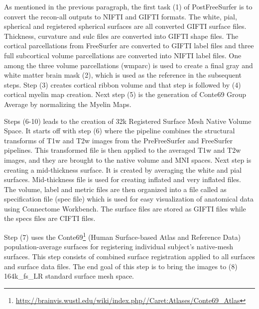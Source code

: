 As mentioned in the previous paragraph, the first task (1) of PostFreeSurfer is to convert the recon-all outputs to NIFTI and GIFTI formats. The white, pial, spherical and registered spherical surfaces are all converted GIFTI surface files. Thickness, curvature and sulc files are converted into GIFTI shape files. The cortical parcellations from FreeSurfer are converted to GIFTI label files and three full subcortical volume parcellations are converted into NIFTI label files. One among the three volume parcellations (wmparc) is used to create a final gray and white matter brain mask (2), which is used as the reference in the subsequent steps. Step (3) creates cortical ribbon volume and that step is followed by (4) cortical myelin map creation. Next step (5) is the generation of Conte69 Group Average by normalizing the Myelin Maps. 


Steps (6-10) leads to the creation of 32k Registered Surface Mesh Native Volume Space. It starts off with step (6) where the pipeline combines the structural transforms of T1w and T2w images from the PreFreeSurfer and FreeSurfer pipelines. This transformed file is then applied to the averaged T1w and T2w images, and they are brought to the native volume and MNI spaces. Next step is creating a mid-thickness surface. It is created by averaging the white and pial surfaces. Mid-thickness file is used for creating inflated and very inflated files. The volume, label and metric files are then organized into a file called as specification file (spec file) which is used for easy visualization of anatomical data using Connectome Workbench. The surface files are stored as GIFTI files while the specs files are CIFTI files.

Step (7) uses the Conte69\footnote{\url{http://brainvis.wustl.edu/wiki/index.php//Caret:Atlases/Conte69\_Atlas}} (Human Surface-based Atlas and Reference Data) population-average surfaces for registering individual subject's native-mesh surfaces. This step consists of combined surface registration applied to all surfaces and surface data files. The end goal of this step is to bring the images to (8) 164k\_fs\_LR standard surface mesh space.


